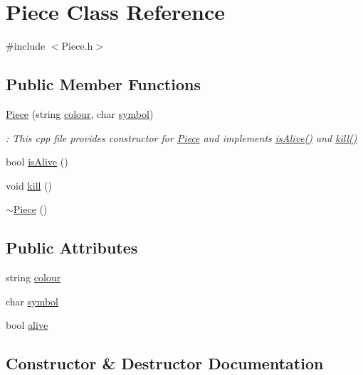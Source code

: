 \hypertarget{classPiece}{}\section{Piece Class Reference}
\label{classPiece}


{\ttfamily \#include $<$Piece.\+h$>$}

\subsection*{Public Member Functions}
\begin{DoxyCompactItemize}
\item 
\hyperlink{classPiece_ad9009085b915df6c20503f2ce144c931}{Piece} (string \hyperlink{classPiece_aa789cfb1749a0dc7ae40c20e369a4321}{colour}, char \hyperlink{classPiece_a00143ae55b69981ae484cc7521b6d81a}{symbol})
\begin{DoxyCompactList}\small\item\em \+: This cpp file provides constructor for \hyperlink{classPiece}{Piece} and implements \hyperlink{classPiece_a9f6a89d6fd5ae865af73c2220d1a5839}{is\+Alive()} and \hyperlink{classPiece_a4c2ace5bc3eb68e46e8599702b782d94}{kill()} \end{DoxyCompactList}\item 
bool \hyperlink{classPiece_a9f6a89d6fd5ae865af73c2220d1a5839}{is\+Alive} ()
\item 
void \hyperlink{classPiece_a4c2ace5bc3eb68e46e8599702b782d94}{kill} ()
\item 
\hyperlink{classPiece_a5d7a4f6bade94cb33b6f634de8aa7918}{$\sim$\+Piece} ()
\end{DoxyCompactItemize}
\subsection*{Public Attributes}
\begin{DoxyCompactItemize}
\item 
string \hyperlink{classPiece_aa789cfb1749a0dc7ae40c20e369a4321}{colour}
\item 
char \hyperlink{classPiece_a00143ae55b69981ae484cc7521b6d81a}{symbol}
\item 
bool \hyperlink{classPiece_a8b3c2f812ead74ba513f521e63f767f9}{alive}
\end{DoxyCompactItemize}


\subsection{Constructor \& Destructor Documentation}
\hypertarget{classPiece_ad9009085b915df6c20503f2ce144c931}{}
